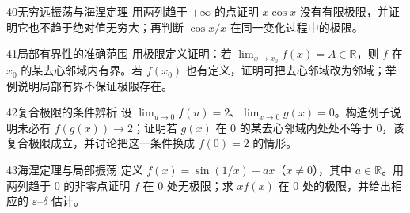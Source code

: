 \begin{exercise}{40}{无穷远振荡与海涅定理}
用两列趋于 $+\infty$ 的点证明 $x\cos x$ 没有有限极限，并证明它也不趋于绝对值无穷大；再判断 $\cos x/x$ 在同一变化过程中的极限。
\end{exercise}
\begin{exercise}{41}{局部有界性的准确范围}
用极限定义证明：若 $\lim_{x\to x_0}f(x)=A\in\mathbb R$，则 $f$ 在 $x_0$ 的某去心邻域内有界。若 $f(x_0)$ 也有定义，证明可把去心邻域改为邻域；举例说明局部有界不保证极限存在。
\end{exercise}
\begin{exercise}{42}{复合极限的条件辨析}
设 $\lim_{u\to0}f(u)=2$、$\lim_{x\to0}g(x)=0$。构造例子说明未必有 $f(g(x))\to2$；证明若 $g(x)$ 在 $0$ 的某去心邻域内处处不等于 $0$，该复合极限成立，并讨论把这一条件换成 $f(0)=2$ 的情形。
\end{exercise}
\begin{exercise}{43}{海涅定理与局部振荡}
定义 $f(x)=\sin(1/x)+ax$（$x\ne0$），其中 $a\in\mathbb R$。用两列趋于 $0$ 的非零点证明 $f$ 在 $0$ 处无极限；求 $xf(x)$ 在 $0$ 处的极限，并给出相应的 $\varepsilon$--$\delta$ 估计。
\end{exercise}
